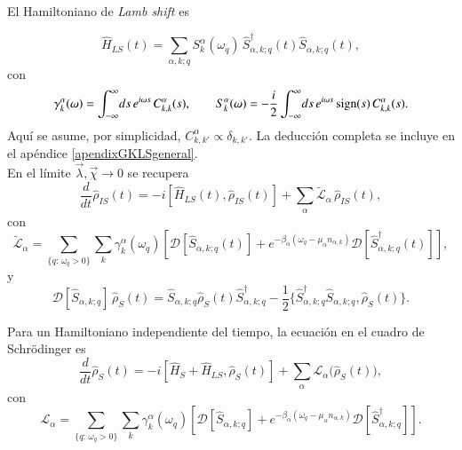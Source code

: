 El Hamiltoniano de \textit{Lamb shift} es 

\begin{equation*}
    \hat{H}_{LS}(t) = \sum_{\alpha,k;q} S^{\alpha}_{k}(\omega_{q})\,
    \hat{S}^{\dagger}_{\alpha,k;q}(t)\hat{S}_{\alpha,k;q}(t),
\end{equation*}
con
\begin{equation}
    \gamma_{k}^{\alpha}(\omega) = \int_{-\infty}^{\infty}\!ds\, e^{i\omega s}\,C^{\alpha}_{k,k}(s),
    \qquad
    S^{\alpha}_{k}(\omega) = - \frac{i}{2} \int_{-\infty}^{\infty}\!ds\, e^{i\omega s}\,\textnormal{sign}(s)\,C^{\alpha}_{k,k}(s).
    \label{sec2:gammaanddelta}
\end{equation}
Aquí se asume, por simplicidad, \(C^{\alpha}_{k,k'}\propto \delta_{k,k'}\). La deducción completa se incluye en el apéndice \ref{apendixGKLSgeneral}.
\\

En el límite \(\vec{\lambda},\vec{\chi}\to 0\) se recupera
\begin{equation*}
    \frac{d}{dt}\hat{\rho}_{IS}(t) 
    = - i[\hat{H}_{LS}(t),\hat{\rho}_{IS}(t)] 
      + \sum_{\alpha}\tilde{\mathcal{L}}_{\alpha}\,\hat{\rho}_{IS}(t),
\end{equation*}
con
\begin{equation*}
    \tilde{\mathcal{L}}_{\alpha} 
    = \sum_{\{q:\,\omega_{q}>0\}} \sum_{k}\gamma^{\alpha}_{k}(\omega_{q})
      \left[
        \mathcal{D}[\hat{S}_{\alpha,k;q}(t)]
        + e^{-\beta_{\alpha}(\omega_{q}-\mu_{\alpha}n_{\alpha,k})}
          \mathcal{D}[\hat{S}^{\dagger}_{\alpha,k;q}(t)]
      \right],
\end{equation*}
y
\begin{equation*}
    \mathcal{D}[\hat{S}_{\alpha,k;q}]\,\hat{\rho}_{S}(t)
    = \hat{S}_{\alpha,k;q}\hat{\rho}_{S}(t)\hat{S}^{\dagger}_{\alpha,k;q}
      - \frac{1}{2}\{\hat{S}^{\dagger}_{\alpha,k;q}\hat{S}_{\alpha,k;q},\hat{\rho}_{S}(t)\}.
\end{equation*}

Para un Hamiltoniano independiente del tiempo, la ecuación en el cuadro de Schrödinger es
\begin{equation}
    \frac{d}{dt}\hat{\rho}_{S}(t) 
    = -i [\hat{H}_{S}+ \hat{H}_{LS},\hat{\rho}_{S}(t)]
      + \sum_{\alpha}\mathcal{L}_{\alpha}\big(\hat{\rho}_{S}(t)\big),
    \label{sec2schrodingerthermo}
\end{equation}
con
\begin{equation}
    \mathcal{L}_{\alpha} 
    = \sum_{\{q:\,\omega_{q}>0\}} \sum_{k}\gamma^{\alpha}_{k}(\omega_{q})
      \left[
        \mathcal{D}[\hat{S}_{\alpha,k;q}]
        + e^{-\beta_{\alpha}(\omega_{q}-\mu_{\alpha}n_{\alpha,k})}
          \mathcal{D}[\hat{S}^{\dagger}_{\alpha,k;q}]
      \right].
    \label{sec2lindbladconsistency}
\end{equation}

